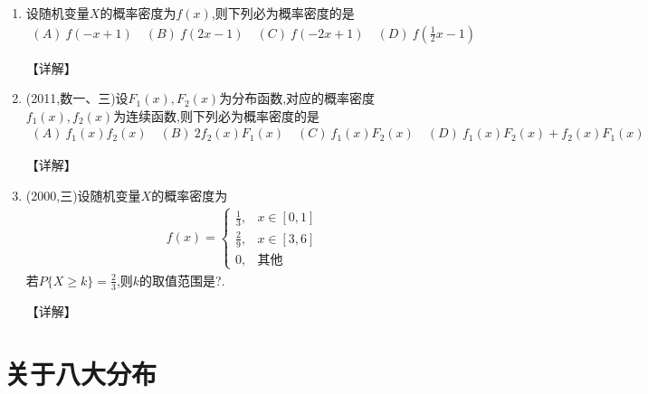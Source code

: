 \documentclass[12pt, a4paper, oneside, UTF8]{ctexbook}
\begin{document}
\begin{enumerate}[label=\arabic*.,start=3]
    \item 设随机变量$X$的概率密度为$f(x)$,则下列必为概率密度的是
    \begin{align*}
        (A)\ f(-x+1) \quad (B)\ f(2x-1) \quad (C)\ f(-2x+1) \quad (D)\ f\left(\frac{1}{2}x-1\right)
    \end{align*}
    
    \begin{solution}
    【详解】
    \end{solution}
    
    \item (2011,数一、三)设$F_1(x),F_2(x)$为分布函数,对应的概率密度$f_1(x),f_2(x)$为连续函数,则下列必为概率密度的是
    \begin{align*}
        (A)\ f_1(x)f_2(x) \quad (B)\ 2f_2(x)F_1(x) \quad (C)\ f_1(x)F_2(x) \quad (D)\ f_1(x)F_2(x)+f_2(x)F_1(x)
    \end{align*}
    
    \begin{solution}
    【详解】
    \end{solution}
    
    \item (2000,三)设随机变量$X$的概率密度为
    \begin{align*}
        f(x)=\begin{cases}
            \frac{1}{3}, & x\in[0,1] \\
            \frac{2}{9}, & x\in[3,6] \\
            0, & \text{其他}
        \end{cases}
    \end{align*}
    若$P\{X\geq k\}=\frac{2}{3}$,则$k$的取值范围是?.
    
    \begin{solution}
    【详解】
    \end{solution}
\end{enumerate}

\section{关于八大分布}
\end{document}
